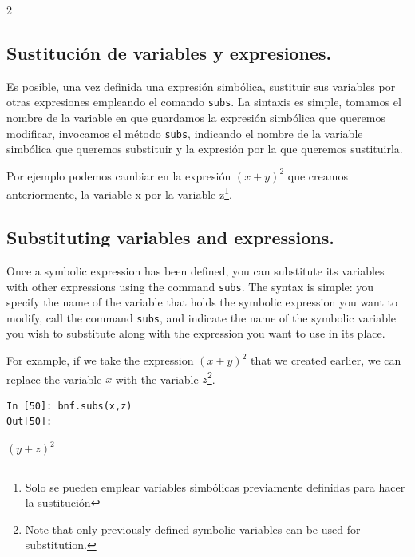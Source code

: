 \begin{paracol}{2}
\subsection{Sustitución de variables y expresiones.}
Es posible, una vez definida una expresión simbólica, sustituir sus variables por otras expresiones empleando el comando \texttt{subs}. La sintaxis es simple, tomamos el nombre de la variable en que guardamos la expresión simbólica que queremos modificar, invocamos el método \texttt{subs}, indicando el nombre de la variable simbólica que queremos substituir y la expresión por la que queremos sustituirla. 

Por ejemplo podemos cambiar en la expresión $(x+y)^2$ que creamos anteriormente, la variable x por la variable z\footnote{Solo se pueden emplear variables simbólicas previamente definidas para hacer la sustitución}. 
\switchcolumn
\subsection{Substituting variables and expressions.}
Once a symbolic expression has been defined, you can substitute its variables with other expressions using the command \texttt{subs}. The syntax is simple: you specify the name of the variable that holds the symbolic expression you want to modify, call the command \texttt{subs}, and indicate the name of the symbolic variable you wish to substitute along with the expression you want to use in its place. 

For example, if we take the expression \((x+y)^2\) that we created earlier, we can replace the variable \(x\) with the variable \(z\)\footnote{Note that only previously defined symbolic variables can be used for substitution.}.

\end{paracol}
\begin{center}
	\begin{minipage}{.25\textwidth}
		\begin{verbatim}
In [50]: bnf.subs(x,z)
Out[50]:
		\end{verbatim}
		$(y+z)^2$
	\end{minipage}
\end{center}

